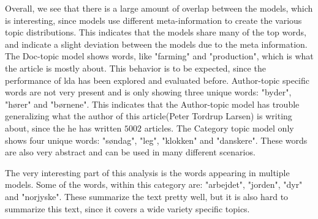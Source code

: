Overall, we see that there is a large amount of overlap between the models, which is interesting, since models use different meta-information to create the various topic distributions.
This indicates that the models share many of the top words, and indicate a slight deviation between the models due to the meta information.
The Doc-topic model shows words, like "farming" and "production", which is what the article is mostly about.
This behavior is to be expected, since the performance of \gls{lda} has been explored and evaluated before. 
Author-topic specific words are not very present and is only showing three unique words: "byder", "hører" and "børnene".
This indicates that the Author-topic model has trouble generalizing what the author of this article(Peter Tordrup Larsen) is writing about, since the he has written $5002$ articles. 
The Category topic model only shows four unique words: "søndag", "leg", "klokken" and "danskere".
These words are also very abstract and can be used in many different scenarios.

The very interesting part of this analysis is the words appearing in multiple models.
Some of the words, within this category are: "arbejdet", "jorden", "dyr" and "norjyske".
These summarize the text pretty well, but it is also hard to summarize this text, since it covers a wide variety specific topics.
